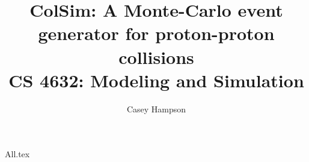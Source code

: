 \documentclass[titlepage]{article}
\title{ColSim: A Monte-Carlo event generator for proton-proton collisions \\[5pt] CS 4632: Modeling and Simulation}
\author{Casey Hampson}
\begin{document}
    \maketitle
    \pagebreak

    {All.tex}

    \pagebreak
    \nocite{*}
    \printbibliography
\end{document}
